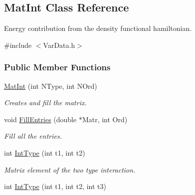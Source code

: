 \hypertarget{classMatInt}{}\subsection{Mat\+Int Class Reference}
\label{classMatInt}


Energy contribution from the density functional hamiltonian.  




{\ttfamily \#include $<$Var\+Data.\+h$>$}

\subsubsection*{Public Member Functions}
\begin{DoxyCompactItemize}
\item 
\hyperlink{classMatInt_a1d837fb7a673781e109b9151a56778ce}{Mat\+Int} (int N\+Type, int N\+Ord)\hypertarget{classMatInt_a1d837fb7a673781e109b9151a56778ce}{}\label{classMatInt_a1d837fb7a673781e109b9151a56778ce}

\begin{DoxyCompactList}\small\item\em Creates and fill the matrix. \end{DoxyCompactList}\item 
void \hyperlink{classMatInt_ab41daf2c7d76c51cc5e440656108477b}{Fill\+Entries} (double $\ast$Matr, int Ord)\hypertarget{classMatInt_ab41daf2c7d76c51cc5e440656108477b}{}\label{classMatInt_ab41daf2c7d76c51cc5e440656108477b}

\begin{DoxyCompactList}\small\item\em Fill all the entries. \end{DoxyCompactList}\item 
int \hyperlink{classMatInt_af5860927a869a9e6d2e82331567537b9}{Int\+Type} (int t1, int t2)\hypertarget{classMatInt_af5860927a869a9e6d2e82331567537b9}{}\label{classMatInt_af5860927a869a9e6d2e82331567537b9}

\begin{DoxyCompactList}\small\item\em Matrix element of the two type interaction. \end{DoxyCompactList}\item 
int \hyperlink{classMatInt_a0ddfc8269f12a7eeff2ec3074d9803e8}{Int\+Type} (int t1, int t2, int t3)\hypertarget{classMatInt_a0ddfc8269f12a7eeff2ec3074d9803e8}{}\label{classMatInt_a0ddfc8269f12a7eeff2ec3074d9803e8}


\end{DoxyCompactItemize}

